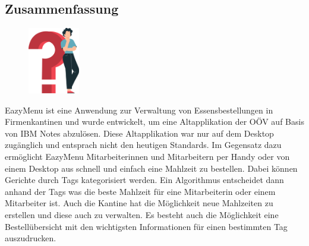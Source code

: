 \begin{spacing}{1}
    \chapter*{Zusammenfassung}
\end{spacing}
\begin{figure}
    \begin{center}
      \includegraphics[width=0.2\textwidth]{pics/question_mark.png}
    \end{center}
\end{figure}
\author{David Ignjatovic}
EazyMenu ist eine Anwendung zur Verwaltung von Essensbestellungen in Firmenkantinen und wurde entwickelt, um eine Altapplikation der OÖV auf Basis von IBM Notes abzulösen. 
Diese Altapplikation war nur auf dem Desktop zugänglich und entsprach nicht den heutigen Standards. 
Im Gegensatz dazu ermöglicht EazyMenu Mitarbeiterinnen und Mitarbeitern per Handy oder von einem Desktop aus schnell und einfach eine Mahlzeit zu bestellen. 
Dabei können Gerichte durch Tags kategorisiert werden. Ein Algorithmus entscheidet dann anhand der Tags was die beste Mahlzeit für eine Mitarbeiterin oder einem Mitarbeiter ist.
Auch die Kantine hat die Möglichkeit neue Mahlzeiten zu erstellen und diese auch zu verwalten. 
Es besteht auch die Möglichkeit eine Bestellübersicht mit den wichtigsten Informationen für einen bestimmten Tag auszudrucken.